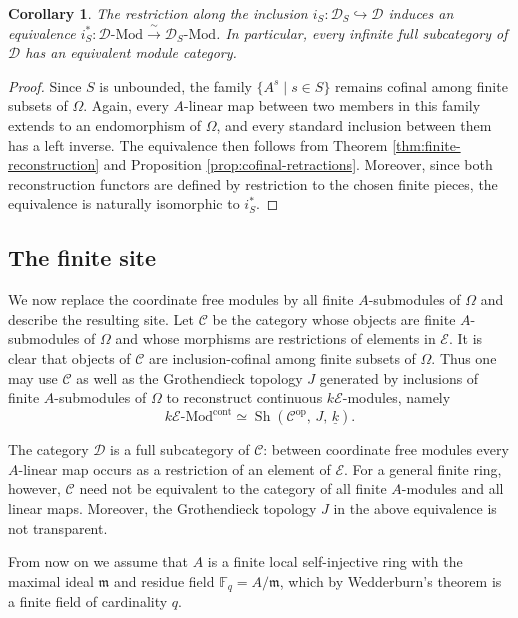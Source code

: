 \documentclass[10pt, reqno]{amsart}
\theoremstyle{plain}
\newtheorem{corollary}[theorem]{Corollary}
\numberwithin{equation}{section}
\theoremstyle{definition}
\newcommand{\Sh}{\operatorname{Sh}}
\newcommand{\Mod}{{\textrm{-}\mathrm{Mod}}}
\newcommand{\op}{\mathrm{op}}
\newcommand{\E}{\mathscr E}
\newcommand{\C}{\mathscr C}
\newcommand{\D}{\mathscr D}
\begin{document}
\begin{corollary}\label{cor:cofinal-rank-invariance}
The restriction along the inclusion $i_S: \D_S \hookrightarrow \D$ induces an equivalence $i_S^*: \D \Mod \xrightarrow{\ \sim\ } \D_S \Mod$. In particular, every infinite full subcategory of $\D$ has an equivalent module category.
\end{corollary}

\begin{proof}
Since $S$ is unbounded, the family $\{A^s \mid s \in S \}$ remains cofinal among finite subsets of $\Omega$. Again, every $A$-linear map between two members in this family extends to an endomorphism of $\Omega$, and every standard inclusion between them has a left inverse. The equivalence then follows from Theorem \ref{thm:finite-reconstruction} and Proposition \ref{prop:cofinal-retractions}. Moreover, since both reconstruction functors are defined by restriction to the chosen finite pieces, the equivalence is naturally isomorphic to $i_S^*$.
\end{proof}


\subsection{The finite site}

We now replace the coordinate free modules by all finite $A$-submodules of $\Omega$ and describe the resulting site. Let $\C$ be the category whose objects are finite $A$-submodules of $\Omega$ and whose morphisms are restrictions of elements in $\E$. It is clear that objects of $\C$ are inclusion-cofinal among finite subsets of $\Omega$. Thus one may use $\C$ as well as the Grothendieck topology $J$ generated by inclusions of finite $A$-submodules of $\Omega$ to reconstruct continuous $k\E$-modules, namely
\[
k\E \Mod^{\mathrm{cont}} \simeq \Sh(\C^{\op}, \, J, \, \underline{k}).
\]

The category $\D$ is a full subcategory of $\C$: between coordinate free modules every $A$-linear map occurs as a restriction of an element of $\E$. For a general finite ring, however, $\C$ need not be equivalent to the category of all finite $A$-modules and all linear maps. Moreover, the Grothendieck topology $J$ in the above equivalence is not transparent.

From now on we assume that $A$ is a finite local self-injective ring with the maximal ideal $\mathfrak m$ and residue field $\mathbb{F}_q = A/\mathfrak m$, which by Wedderburn's theorem is a finite field of cardinality $q$.
\end{document}
